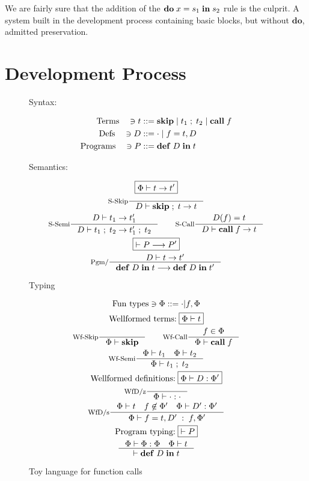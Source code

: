 \documentclass[a4paper, oneside, 10pt, draft]{memoir}
\begin{document}
We are fairly sure that the addition of the $\mathbf{do} \; x = s_1 \; \mathbf{in} \; s_2$ rule
is the culprit. A system built in the development process containing
basic blocks, but without $\mathbf{do}$, admitted preservation.

\chapter{Development Process}

\newcommand{\fskip}{\mathbf{skip}}
\newcommand{\fsemi}[2]{#1 \; ; \; #2}
\newcommand{\fcall}[1]{\mathbf{call} \; #1}
\newcommand{\fpgm}[2]{\mathbf{def} \; #1 \; \mathbf{in} \; #2}
\begin{figure}
  \begin{center}
    Syntax:
  \end{center}
  \begin{align*}
    \text{Terms} \quad \ni t & ::= \fskip{} \bor \fsemi{t_1}{t_2} \bor
    \fcall{f}\\
    \text{Defs} \quad \ni D & ::= \cdot \bor f = t, D\\
    \text{Programs} \quad \ni P & ::= \fpgm{D}{t}
  \end{align*}
  \begin{center}
    Semantics:
  \end{center}
  \begin{gather*}
    \boxed{\Phi |- t -> t'}\\
    \inference[S-Skip]{}{D |- \fsemi{\fskip{}}{t} -> t}\\
    \inference[S-Semi]{D |- t_1 -> t'_1}{D |- \fsemi{t_1}{t_2}
      -> \fsemi{t'_1}{t_2}} \quad \quad
    \inference[S-Call]{D(f) = t}{D |- \fcall{f} -> t}\\
    \boxed{|- P --> P'}\\
    \inference[Pgm/]{D |- t -> t'}{\fpgm{D}{t} --> \fpgm{D}{t'}}
  \end{gather*}
  \begin{center}
    Typing
  \end{center}
  \begin{gather*}
    \text{Fun types} \ni \Phi ::= \cdot | f,\Phi\\
    \text{Wellformed terms:} \; \boxed{\Phi |- t}\\
    \inference[Wf-Skip]{}{\Phi |- \fskip{}} \quad \quad
    \inference[Wf-Call]{f \in \Phi}{\Phi |- \fcall{f}}\\
    \inference[Wf-Semi]{\Phi |- t_1 \quad \Phi |- t_2}{\Phi |-
      \fsemi{t_1}{t_2}}\\
    \text{Wellformed definitions:} \; \boxed{\Phi |- D :
      \Phi'}\\
    \inference[WfD/z]{}{\Phi |- \cdot : \cdot}\\
    \inference[WfD/s]{\Phi |- t \quad f \not \in \Phi' \quad
      \Phi |- D' : \Phi'}{\Phi |- f = t, D' \; : \;
      f,\Phi'}\\
    \text{Program typing:} \; \boxed{|- P}\\
    \inference{\Phi |- \Phi : \Phi \quad \Phi |- t}{|- \fpgm{D}{t}}
  \end{gather*}
  \caption{Toy language for function calls}
  \label{fig:func-call-lang}
\end{figure}
\end{document}

